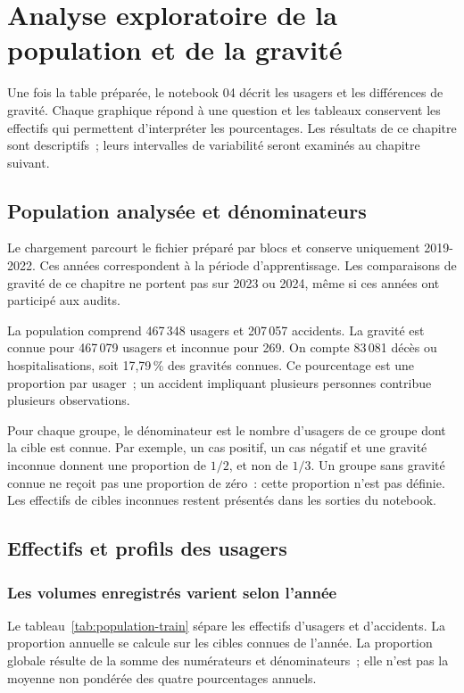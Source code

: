 \chapter{Analyse exploratoire de la population et de la gravité}
\label{chap:exploration}

Une fois la table préparée, le notebook 04 décrit les usagers et les différences de
gravité. Chaque graphique répond à une question et les tableaux conservent les effectifs
qui permettent d'interpréter les pourcentages. Les résultats de ce chapitre sont
descriptifs~; leurs intervalles de variabilité seront examinés au chapitre suivant.

\section{Population analysée et dénominateurs}
Le chargement parcourt le fichier préparé par blocs et conserve uniquement 2019-2022.
Ces années correspondent à la période d'apprentissage. Les comparaisons de gravité de
ce chapitre ne portent pas sur 2023 ou 2024, même si ces années ont participé aux audits.

La population comprend 467\,348 usagers et 207\,057 accidents. La gravité est connue
pour 467\,079 usagers et inconnue pour 269. On compte 83\,081 décès ou hospitalisations,
soit 17,79\,\% des gravités connues. Ce pourcentage est une proportion par usager~;
un accident impliquant plusieurs personnes contribue plusieurs observations.

Pour chaque groupe, le dénominateur est le nombre d'usagers de ce groupe dont la cible
est connue. Par exemple, un cas positif, un cas négatif et une gravité inconnue donnent
une proportion de $1/2$, et non de $1/3$. Un groupe sans gravité connue ne reçoit pas
une proportion de zéro~: cette proportion n'est pas définie. Les effectifs de cibles
inconnues restent présentés dans les sorties du notebook.

\section{Effectifs et profils des usagers}
\subsection{Les volumes enregistrés varient selon l'année}
Le tableau~\ref{tab:population-train} sépare les effectifs d'usagers et d'accidents.
La proportion annuelle se calcule sur les cibles connues de l'année. La proportion
globale résulte de la somme des numérateurs et dénominateurs~; elle n'est pas la moyenne
non pondérée des quatre pourcentages annuels.


